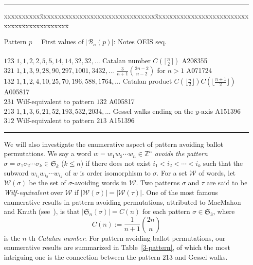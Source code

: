 \documentclass[12pt]{amsart}
\numberwithin{equation}{section}
\theoremstyle{plain}
\theoremstyle{definition}
\newcommand{\Z}{\mathbb{Z}}
\newcommand{\B}{\mathcal{B}}
\def\S{\mathfrak{S}}
\begin{document}
\begin{table}
\hrule
{\small
\begin{tabbing}
xxxxxxxxxx\=xxxxxxxxxxxxxxxxxxxxxxxxxxxxxxxx\= xxxxxxxxxxxxxxxxxxxxxxxxxxxxxxx\=xxxxxxxxxxxxx\= \kill

Pattern $p$\> $\quad$First values of $|\B_n(p)|$: \> Notes\> OEIS seq.\\
\\
$123$\> $ 1, 1,2,2,5,5,14,14,32,32,\ldots$ \>  Catalan number $C(\lceil\frac{n}{2}\rceil)$  \> A208355  \\
$321$\> $1,1,3,9,28,90,297,1001, 3432,\ldots$ \> $\frac{3}{n+1}{2n-2\choose n-2}$ for $n>1$  \> A071724   \\
$132$\> $1,1,2,4,10,25,70,196,  588, 1764, \ldots$ \> Catalan product $C(\lfloor\frac{n}{2}\rfloor)C(\lfloor\frac{n+1}{2}\rfloor)$ \> A005817   \\
$231$\> Wilf-equivalent to pattern $132$ \>    \> A005817   \\
$213$\> $1,1,3,6,21,52,193,532, 2034,\ldots$\> Gessel walks ending on the $y$-axis  \> A151396    \\
$312$\>   Wilf-equivalent to pattern $213$ \>   \> A151396
\vspace{.1in}
\end{tabbing}
}
\hrule
\vspace{.2in}
\caption{Length-$3$ patterns  for Ballot permutations.\label{3-pattern}}
\end{table}



We will also investigate the enumerative aspect of pattern avoiding ballot permutations.
We say a word $w=w_1w_2\cdots w_n\in\Z^n$ {\em avoids the pattern} $\sigma=\sigma_1\sigma_2\cdots \sigma_k\in\S_k$ ($k\leq n$) if there does not exist $i_1<i_2<\cdots<i_k$ such that  the subword $w_{i_1}w_{i_2}\cdots w_{i_k}$ of $w$ is order isomorphism to $\sigma$. For a set $\mathcal{W}$ of words, let $\mathcal{W}(\sigma)$ be the set of $\sigma$-avoiding words in $\mathcal{W}$. Two patterns $\sigma$ and $\tau$ are said to be {\em Wilf-equivalent} over $\mathcal{W}$ if $|\mathcal{W}(\sigma)|=|\mathcal{W}(\tau)|$. 
%
One of the most famous enumerative results in pattern avoiding permutations, attributed to MacMahon and Knuth (see~\cite{kit,SS}), is that $|\S_n(\sigma)|=C(n)$ for each pattern $\sigma\in\S_3$, where 
$$C(n):=\frac{1}{n+1}\binom{2n}{n}
$$ is the $n$-th {\em Catalan number}. For pattern avoiding ballot permutations, our enumerative results are summarized in Table~\ref{3-pattern}, of which the most intriguing one is the connection between the pattern $213$ and Gessel walks. 
\end{document}
